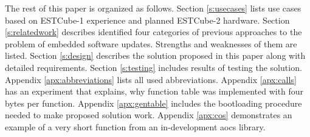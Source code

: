 The rest of this paper is organized as follows. Section \ref{s:usecases} lists use cases based on ESTCube-1 experience and planned ESTCube-2 hardware. Section \ref{s:relatedwork} describes identified four categories of previous approaches to the problem of embedded software updates. Strengths and weaknesses of them are listed. Section \ref{s:design} describes the solution proposed in this paper along with detailed requirements. Section \ref{s:testing} includes results of testing the solution. Appendix \ref{apx:abbreviations} lists all used abbreviations. Appendix \ref{apx:calls} has an experiment that explains, why function table was implemented with four bytes per function. Appendix \ref{apx:gentable} includes the bootloading procedure needed to make proposed solution work. Appendix \ref{apx:cos} demonstrates an example of a very short function from an in-development \gls{aocs} library.
